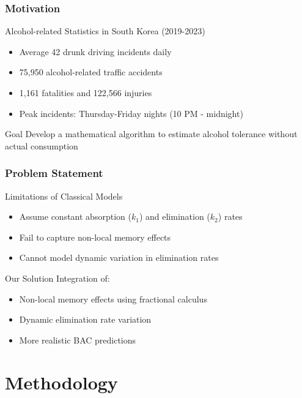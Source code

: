 \documentclass{beamer}
\begin{document}
\begin{frame}
\frametitle{Motivation}
\begin{block}{Alcohol-related Statistics in South Korea (2019-2023)}
\begin{itemize}
    \item Average 42 drunk driving incidents daily
    \item 75,950 alcohol-related traffic accidents
    \item 1,161 fatalities and 122,566 injuries
    \item Peak incidents: Thursday-Friday nights (10 PM - midnight)
\end{itemize}
\end{block}

\vspace{0.5cm}
\begin{alertblock}{Goal}
Develop a mathematical algorithm to estimate alcohol tolerance without actual consumption
\end{alertblock}
\end{frame}

\begin{frame}
\frametitle{Problem Statement}
\begin{block}{Limitations of Classical Models}
\begin{itemize}
    \item Assume constant absorption ($k_1$) and elimination ($k_2$) rates
    \item Fail to capture non-local memory effects
    \item Cannot model dynamic variation in elimination rates
\end{itemize}
\end{block}

\vspace{0.5cm}
\begin{block}{Our Solution}
Integration of:
\begin{itemize}
    \item Non-local memory effects using fractional calculus
    \item Dynamic elimination rate variation
    \item More realistic BAC predictions
\end{itemize}
\end{block}
\end{frame}

\section{Methodology}
\end{document}
